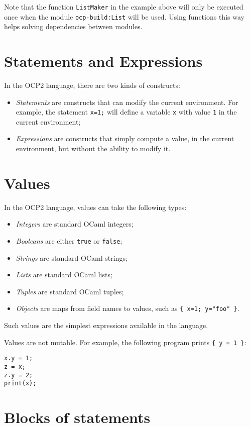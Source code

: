 Note that the function {\tt ListMaker} in the example above will only
be executed once when the module {\tt ocp-build:List} will be
used. Using functions this way helps solving dependencies between
modules.

\section{Statements and Expressions}

In the OCP2 language, there are two kinds of constructs:
\begin{itemize}
\item \emph{Statements} are constructs that can modify the current
  environment. For example, the statement \verb+x=1;+ will define a
  variable \verb-x- with value \verb-1- in the current environment;
\item \emph{Expressions} are constructs that simply compute a value,
  in the current environment, but without the ability to modify it.
\end{itemize}

\section{Values}

In the OCP2 language, values can take the following types:
\begin{itemize}
\item \emph{Integers} are standard OCaml integers;
\item \emph{Booleans} are either \verb+true+ or \verb+false+;
\item \emph{Strings} are standard OCaml strings;
\item \emph{Lists} are standard OCaml lists;
\item \emph{Tuples} are standard OCaml tuples;
\item \emph{Objects} are maps from field names to values, such as
  \verb+{ x=1; y="foo" }+.
\end{itemize}

Such values are the simplest expressions available in the
language.

Values are not mutable. For example, the following program prints
\verb+{ y = 1 }+:
\begin{verbatim}
x.y = 1;
z = x;
z.y = 2;
print(x);
\end{verbatim}

\section{Blocks of statements}


